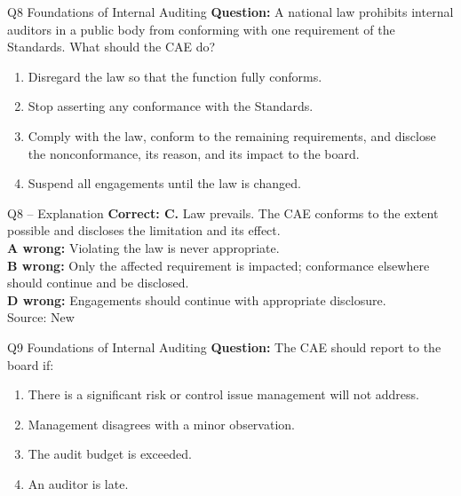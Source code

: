 \documentclass[aspectratio=169,10pt]{beamer}
\begin{document}
\begin{frame}[t]{Q8 \hfill {\scriptsize Foundations of Internal Auditing}}
	\small
	\textbf{Question:} A national law prohibits internal auditors in a public body from conforming with one requirement of the Standards. What should the CAE do?
	\begin{enumerate}[label=\Alph*.,itemsep=1pt,topsep=3pt]
			\item Disregard the law so that the function fully conforms.
			\item Stop asserting any conformance with the Standards.
			\item Comply with the law, conform to the remaining requirements, and disclose the nonconformance, its reason, and its impact to the board.
			\item Suspend all engagements until the law is changed.
	\end{enumerate}
\end{frame}

\begin{frame}[t]{Q8 -- Explanation}
	\footnotesize
	\textbf{Correct: C.} Law prevails. The CAE conforms to the extent possible and discloses the limitation and its effect. \\[5pt]
\textbf{A wrong:} Violating the law is never appropriate. \\[3pt]
\textbf{B wrong:} Only the affected requirement is impacted; conformance elsewhere should continue and be disclosed. \\[3pt]
\textbf{D wrong:} Engagements should continue with appropriate disclosure. \\[3pt]
	\vfill {\tiny Source: New}
\end{frame}

\begin{frame}[t]{Q9 \hfill {\scriptsize Foundations of Internal Auditing}}
	\small
	\textbf{Question:} The CAE should report to the board if:
	\begin{enumerate}[label=\Alph*.,itemsep=1pt,topsep=3pt]
			\item There is a significant risk or control issue management will not address.
			\item Management disagrees with a minor observation.
			\item The audit budget is exceeded.
			\item An auditor is late.
	\end{enumerate}
\end{frame}
\end{document}
